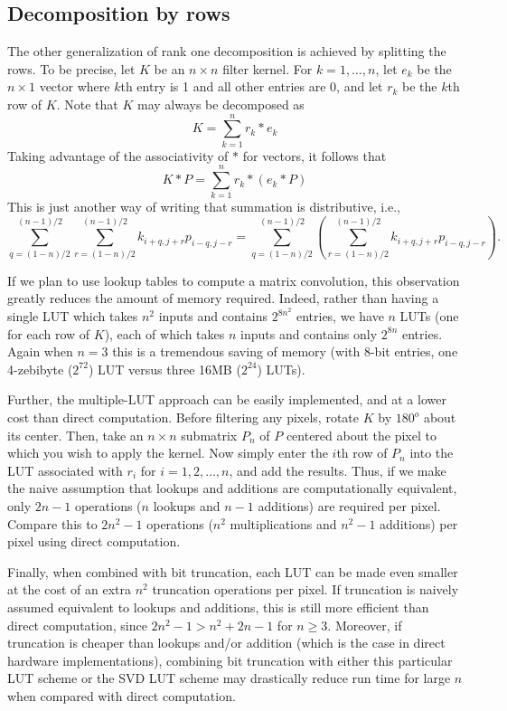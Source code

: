 \documentclass[12pt]{amsart}
\theoremstyle{definition}
\theoremstyle{remark}
\numberwithin{thm}{section}
\begin{document}
\subsection{Decomposition by rows}
The other generalization of rank one decomposition is achieved by splitting the rows. To be precise, let $K$ be an $n\times n$ filter kernel. For $k=1,\ldots,n$, let $e_k$ be the $n\times 1$ vector where $k$th entry is 1 and all other entries are 0, and let $r_k$ be the $k$th row of $K$. Note that $K$ may always be decomposed as 
$$K = \sum_{k=1}^nr_k * e_k$$
Taking advantage of the associativity of $*$ for vectors, it follows that 
$$K * P= \sum_{k=1}^n r_k * (e_k * P)$$
This is just another way of writing that summation is distributive, i.e.,
\[\sum_{q = (1-n)/2}^{(n-1)/2}\sum_{r = (1-n)/2}^{(n-1)/2}k_{i+q,j+r}p_{i-q,j-r} = \sum_{q = (1-n)/2}^{(n-1)/2}\left(\sum_{r = (1-n)/2}^{(n-1)/2}k_{i+q,j+r}p_{i-q,j-r}\right).\]

If we plan to use lookup tables to compute a matrix convolution, this observation greatly reduces the amount of memory required. Indeed, rather than having a single LUT which takes $n^2$ inputs and contains $2^{8n^2}$ entries, we have $n$ LUTs (one for each row of $K$), each of which takes $n$ inputs and contains only $2^{8n}$ entries. Again when $n=3$ this is a tremendous saving of memory (with 8-bit entries, one 4-zebibyte ($2^{72}$) LUT versus three 16MB ($2^{24}$) LUTs).

Further, the multiple-LUT approach can be easily implemented, and at a lower cost than direct computation. Before filtering any pixels, rotate $K$ by $180^o$ about its center. Then, take an $n\times n$ submatrix $P_n$ of $P$ centered about the pixel to which you wish to apply the kernel. Now simply enter the $i$th row of $P_n$ into the LUT associated with $r_i$ for $i = 1,2,\ldots,n$, and add the results. Thus, if we make the naive assumption that lookups and additions are computationally equivalent, only $2n-1$ operations ($n$ lookups and $n-1$ additions) are required per pixel. Compare this to $2n^2-1$ operations ($n^2$ multiplications and $n^2-1$ additions) per pixel using direct computation.

Finally, when combined with bit truncation, each LUT can be made even smaller at the cost of an extra $n^2$ truncation operations per pixel. If truncation is naively assumed equivalent to lookups and additions, this is still more efficient than direct computation, since $2n^2-1 > n^2+2n-1$ for $n\ge3$. Moreover, if truncation is cheaper than lookups and/or addition (which is the case in direct hardware implementations), combining bit truncation with either this particular LUT scheme or the SVD LUT scheme may drastically reduce run time for large $n$ when compared with direct computation.
\end{document}
